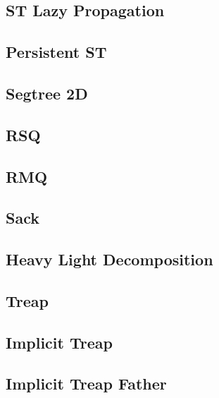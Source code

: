 \subsection{ST Lazy Propagation}
\raggedbottom
\hrulefill
\subsection{Persistent ST}
\raggedbottom
\hrulefill
\subsection{Segtree 2D}
\raggedbottom
\hrulefill
\subsection{RSQ}
\raggedbottom
\hrulefill
\subsection{RMQ}
\raggedbottom
\hrulefill
\subsection{Sack}
\raggedbottom
\hrulefill
\subsection{Heavy Light Decomposition}
\raggedbottom
\hrulefill
\subsection{Treap}
\raggedbottom
\hrulefill
\subsection{Implicit Treap}
\raggedbottom
\hrulefill
\subsection{Implicit Treap Father}
\raggedbottom
\hrulefill
